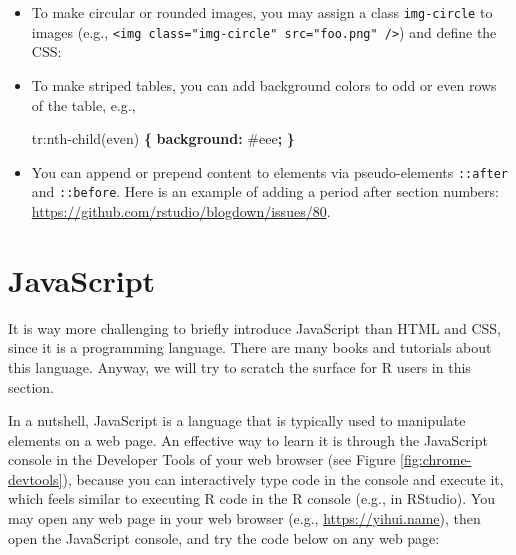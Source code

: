 \documentclass[12pt,]{krantz}
\makeatletter
\newenvironment{Shaded}{\begin{snugshade}}{\end{snugshade}}
\newcommand{\KeywordTok}[1]{\textcolor[rgb]{0.13,0.29,0.53}{\textbf{#1}}}
\newcommand{\DataTypeTok}[1]{\textcolor[rgb]{0.13,0.29,0.53}{#1}}
\newcommand{\DecValTok}[1]{\textcolor[rgb]{0.00,0.00,0.81}{#1}}
\newcommand{\FloatTok}[1]{\textcolor[rgb]{0.00,0.00,0.81}{#1}}
\newcommand{\NormalTok}[1]{#1}
\newenvironment{kframe}{%
\medskip{}
\setlength{\fboxsep}{.8em}
 \def\at@end@of@kframe{}%
 \ifinner\ifhmode%
  \def\at@end@of@kframe{\end{minipage}}%
  \begin{minipage}{\columnwidth}%
 \fi\fi%
 \def\FrameCommand##1{\hskip\@totalleftmargin \hskip-\fboxsep
 \colorbox{shadecolor}{##1}\hskip-\fboxsep
     \hskip-\linewidth \hskip-\@totalleftmargin \hskip\columnwidth}%
 \MakeFramed {\advance\hsize-\width
   \@totalleftmargin\z@ \linewidth\hsize
   \@setminipage}}%
 {\par\unskip\endMakeFramed%
 \at@end@of@kframe}
\renewenvironment{Shaded}{\begin{kframe}}{\end{kframe}}
\theoremstyle{definition}
\theoremstyle{definition}
\theoremstyle{definition}
\theoremstyle{remark}
\makeatother
\begin{document}
\begin{itemize}
\item
  To make circular or rounded images, you may assign a class
  \texttt{img-circle} to images (e.g.,
  \texttt{\textless{}img\ class="img-circle"\ src="foo.png"\ /\textgreater{}})
  and define the CSS:

\begin{Shaded}
\end{Shaded}
\item
  To make striped tables, you can add background colors to odd or even
  rows of the table, e.g.,

\begin{Shaded}
\begin{Highlighting}[]
\NormalTok{tr}\DecValTok{:nth-child}\NormalTok{(even) }\KeywordTok{\{}
  \KeywordTok{background:} \DataTypeTok{#eee}\KeywordTok{;}
\KeywordTok{\}}
\end{Highlighting}
\end{Shaded}
\item
  You can append or prepend content to elements via pseudo-elements
  \texttt{::after} and \texttt{::before}. Here is an example of adding a
  period after section numbers:
  \url{https://github.com/rstudio/blogdown/issues/80}.
\end{itemize}

\section{JavaScript}\label{javascript}

It is way more challenging to briefly introduce
JavaScript than HTML and CSS, since it is a
programming language. There are many books and tutorials about this
language. Anyway, we will try to scratch the surface for R users in this
section.

In a nutshell, JavaScript is a language that is typically used to
manipulate elements on a web page. An effective way to learn it is
through the JavaScript console in the Developer Tools of your web
browser (see Figure \ref{fig:chrome-devtools}), because you can
interactively type code in the console and execute it, which feels
similar to executing R code in the R console (e.g., in RStudio). You may
open any web page in your web browser (e.g., \url{https://yihui.name}),
then open the JavaScript console, and try the code below on any web
page:
\end{document}
